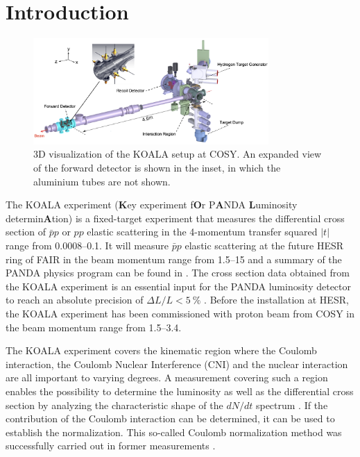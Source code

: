\documentclass[number,5p]{elsarticle}
\begin{document}

\section{Introduction}
\label{sec:introduction}

\begin{figure}[htbp]
	\centering
	\includegraphics[width=0.8\textwidth]{./koala_setup_new.png}
	\caption{3D visualization of the KOALA setup at COSY. An expanded view of the
  forward detector is shown in the inset, in which the aluminium tubes are not shown.}
	\label{fig:setup}
\end{figure}

The KOALA experiment (\textbf{K}ey experiment f\textbf{O}r P\textbf{A}NDA
\textbf{L}uminosity determin\textbf{A}tion) is a fixed-target experiment that
measures the differential cross section of $\bar{p}p$ or $pp$ elastic scattering
in the 4-momentum transfer squared $|t|$ range from \SIrange{0.0008}{0.1}{\tmom}.
It will measure $\bar{p}p$ elastic scattering at the future HESR ring of FAIR \cite{FAIR} in the beam momentum range from
\SIrange{1.5}{15}{\momentum} and a summary of the PANDA physics program can be found
in \cite{panda}.
The cross section data obtained from the KOALA experiment is an essential input for the PANDA luminosity detector to
reach an absolute precision of $\Delta L/L < \SI{5}{\percent}$ \cite{lmd_tdr}.
Before the installation at HESR, the KOALA experiment has been commissioned with
proton beam from COSY \cite{COSY} in the beam momentum range from \SIrange{1.5}{3.4}{\momentum}.

The KOALA experiment covers the kinematic region where the
Coulomb interaction, the Coulomb Nuclear Interference (CNI) and the nuclear interaction are all important to varying degrees.
A measurement covering such a region enables the possibility to determine the
luminosity as well as the differential cross section by analyzing the
characteristic shape of the $dN/dt$ spectrum \cite{bernard1987real,jenni2008atlas}.
If the contribution of the Coulomb interaction can be determined, it can be used
to establish the normalization.
This so-called Coulomb normalization method was successfully carried out in former measurements \cite{koala_article}.
\end{document}

